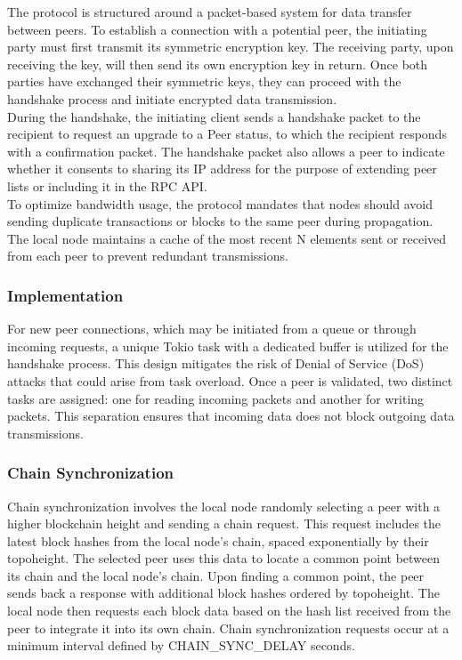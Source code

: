\documentclass[12pt,a4paper,twocolumn]{article}
\begin{document}
The protocol is structured around a packet-based system for data transfer between peers. To establish a connection with a potential peer, the initiating party must first transmit its symmetric encryption key. The receiving party, upon receiving the key, will then send its own encryption key in return. Once both parties have exchanged their symmetric keys, they can proceed with the handshake process and initiate encrypted data transmission.\\

During the handshake, the initiating client sends a handshake packet to the recipient to request an upgrade to a Peer status, to which the recipient responds with a confirmation packet. The handshake packet also allows a peer to indicate whether it consents to sharing its IP address for the purpose of extending peer lists or including it in the RPC API.\\

To optimize bandwidth usage, the protocol mandates that nodes should avoid sending duplicate transactions or blocks to the same peer during propagation. The local node maintains a cache of the most recent N elements sent or received from each peer to prevent redundant transmissions.\\

\subsubsection{Implementation}

For new peer connections, which may be initiated from a queue or through incoming requests, a unique Tokio task with a dedicated buffer is utilized for the handshake process. This design mitigates the risk of Denial of Service (DoS) attacks that could arise from task overload. Once a peer is validated, two distinct tasks are assigned: one for reading incoming packets and another for writing packets. This separation ensures that incoming data does not block outgoing data transmissions.\\

\subsubsection{Chain Synchronization}

Chain synchronization involves the local node randomly selecting a peer with a higher blockchain height and sending a chain request. This request includes the latest block hashes from the local node’s chain, spaced exponentially by their topoheight. The selected peer uses this data to locate a common point between its chain and the local node’s chain. Upon finding a common point, the peer sends back a response with additional block hashes ordered by topoheight. The local node then requests each block data based on the hash list received from the peer to integrate it into its own chain. Chain synchronization requests occur at a minimum interval defined by CHAIN\_SYNC\_DELAY seconds.\\
\end{document}
